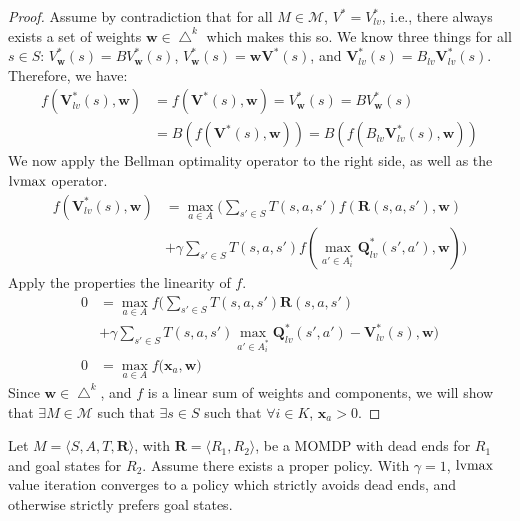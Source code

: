 \begin{proof}
Assume by contradiction that for all $M \in \mathcal{M}$, $V^* = V_{lv}^*$, i.e., there always exists a set of weights $\mathbf{w} \in \bigtriangleup^k$ which makes this so. We know three things for all $s \in S$: $V_{\mathbf{w}}^*(s) = B V_{\mathbf{w}}^*(s)$, $V_{\mathbf{w}}^*(s) = \mathbf{w} \mathbf{V}^*(s)$, and $\mathbf{V}_{lv}^*(s) = B_{lv} \mathbf{V}_{lv}^*(s)$. Therefore, we have:
\begin{align*}
    f(\mathbf{V}_{lv}^*(s), \mathbf{w}) &= f(\mathbf{V}^*(s), \mathbf{w}) = V_{\mathbf{w}}^*(s) = B V_{\mathbf{w}}^*(s) \\
        &= B( f(\mathbf{V}^*(s), \mathbf{w})) = B (f(B_{lv} \mathbf{V}_{lv}^*(s), \mathbf{w}))
\end{align*}
We now apply the Bellman optimality operator to the right side, as well as the $\operatorname*{lvmax}$ operator.
\begin{align*}
    f(\mathbf{V}_{lv}^*(s), \mathbf{w}) &= \max_{a \in A} \Big( \sum_{s' \in S} T(s, a, s') f(\mathbf{R}(s, a, s'), \mathbf{w}) \\
        &+ \gamma \sum_{s' \in S} T(s, a, s') f(\max_{a' \in A_i^*} \mathbf{Q}_{lv}^*(s', a'), \mathbf{w}) \Big)
\end{align*}
Apply the properties the linearity of $f$.
\begin{align*}
    0 &= \max_{a \in A} f\Big( \sum_{s' \in S} T(s, a, s') \mathbf{R}(s, a, s') \\
        &+ \gamma \sum_{s' \in S} T(s, a, s') \max_{a' \in A_i^*} \mathbf{Q}_{lv}^*(s', a') - \mathbf{V}_{lv}^*(s), \mathbf{w} \Big) \\
    0 &= \max_{a \in A} f\Big( \mathbf{x}_a, \mathbf{w} \Big)
\end{align*}
Since $\mathbf{w} \in \bigtriangleup^k$, and $f$ is a linear sum of weights and components, we will show that $\exists M \in \mathcal{M}$ such that $\exists s \in S$ such that $\forall i \in K$, $\mathbf{x}_a > 0$.
\end{proof}


\begin{proposition}
    \label{prop:lvmax_dead_end_avoidance}
    Let $M = \langle S, A, T, \mathbf{R} \rangle$, with $\mathbf{R} = \langle R_1, R_2 \rangle$, be a MOMDP with dead ends for $R_1$ and goal states for $R_2$. Assume there exists a proper policy. With $\gamma = 1$, $\operatorname*{lvmax}$ value iteration converges to a policy which strictly avoids dead ends, and otherwise strictly prefers goal states.
\end{proposition}

